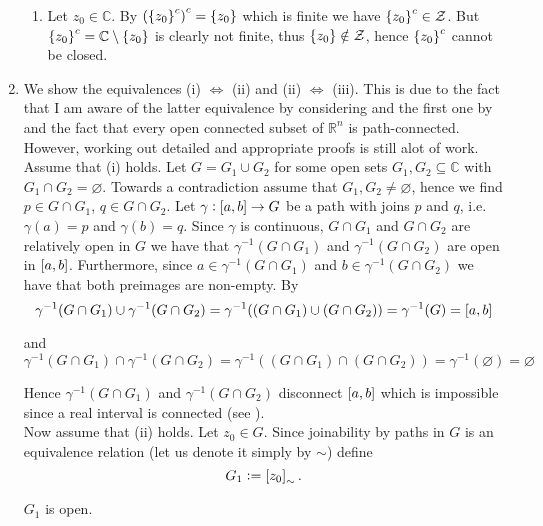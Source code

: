 \begin{enumerate}[label = \textbf{Exercise \arabic*.},wide = 0pt, itemsep=1.5ex]
\begin{enumerate}[label = (\roman*),wide = 10pt, itemsep=1.5ex]
	\item Let $z_0 \in \mathbb{C}$. By $\del[0]{\cbr[0]{z_0}^c}^c = \cbr[0]{z_0}$ which is finite we have $\cbr[0]{z_0}^c \in \mathcal{Z}$. But $\cbr[0]{z_0}^c = \mathbb{C} \setminus \cbr[0]{z_0}$ is clearly not finite, thus $\cbr[0]{z_0} \notin \mathcal{Z}$, hence $\cbr[0]{z_0}^c$ cannot be closed. 
	\end{enumerate}
\item We show the equivalences (i) $\Leftrightarrow$ (ii) and (ii) $\Leftrightarrow$ (iii). This is due to the fact that I am aware of the latter equivalence by considering \cite[86]{lee:topological_manifolds:2011} and the first one by \cite[90]{lee:topological_manifolds:2011} and the fact that every open connected subset of $\mathbb{R}^n$ is path-connected. However, working out detailed and appropriate proofs is still alot of work.\\
	Assume that (i) holds. Let $G = G_1 \cup G_2$ for some open sets $G_1,G_2 \subseteq \mathbb{C}$ with $G_1 \cap G_2 = \varnothing$. Towards a contradiction assume that $G_1,G_2 \neq \varnothing$, hence we find $p \in G \cap G_1$, $q \in G \cap G_2$. Let $\gamma: \intcc{a,b} \to G$ be a path with joins $p$ and $q$, i.e. $\gamma(a) = p$ and $\gamma(b) = q$. Since $\gamma$ is continuous, $G \cap G_1$ and $G \cap G_2$ are relatively open in $G$ we have that $\gamma^{-1}(G \cap G_1)$ and $\gamma^{-1}(G \cap G_2)$ are open in $\intcc{a,b}$. Furthermore, since $a \in \gamma^{-1}(G \cap G_1)$ and $b \in \gamma^{-1}(G \cap G_2)$ we have that both preimages are non-empty. By
	\begin{equation*}
		\gamma^{-1}(G \cap G_1) \cup \gamma^{-1}(G \cap G_2) = \gamma^{-1}((G \cap G_1) \cup (G \cap G_2)) = \gamma^{-1}(G) = \intcc{a,b}
	\end{equation*}

	\noindent and
	\begin{equation*}
		\gamma^{-1}(G \cap G_1) \cap \gamma^{-1}(G \cap G_2) = \gamma^{-1}((G \cap G_1) \cap (G \cap G_2)) = \gamma^{-1}(\varnothing) = \varnothing  
	\end{equation*}
	
	Hence $\gamma^{-1}(G \cap G_1)$ and $\gamma^{-1}(G \cap G_2)$ disconnect $\intcc{a,b}$ which is impossible since a real interval is connected (see \cite[89]{lee:topological_manifolds:2011}).\\

	Now assume that (ii) holds. Let $z_0 \in G$. Since joinability by paths in $G$ is an equivalence relation (let us denote it simply by $\sim$) define
	\begin{equation}
		G_1 := \sbr[0]{z_0}_\sim.
	\end{equation}
		\begin{lemma}
			$G_1$ is open.
			\label{lem:G_1}
		\end{lemma}


\end{enumerate}
